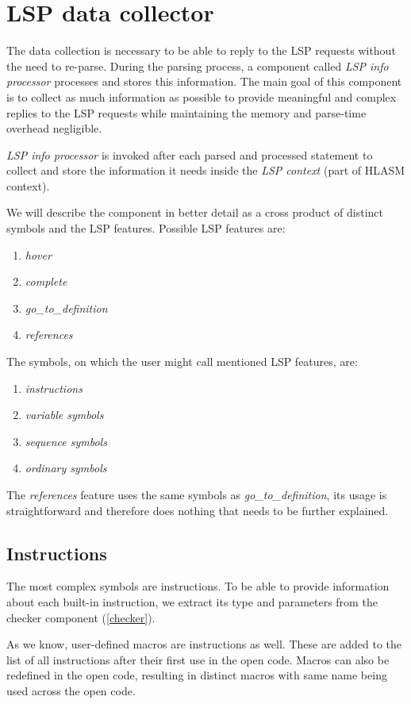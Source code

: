 \section{LSP data collector}
\label{lsp_data}
The data collection is necessary to be able to reply to the LSP requests without the need to re-parse. During the parsing process, a component called \emph{LSP info processor} processes and stores this information. The main goal of this component is to collect as much information as possible to provide meaningful and complex replies to the LSP requests while maintaining the memory and parse-time overhead negligible.

\emph{LSP info processor} is invoked after each parsed and processed statement to collect and store the information it needs inside the \emph{LSP context} (part of HLASM context). 

We will describe the component in better detail as a cross product of distinct symbols and the LSP features. Possible LSP features are:
\begin{enumerate}
	\item \emph{hover}
	\item \emph{complete}
	\item \emph{go\_to\_definition}
	\item \emph{references}
\end{enumerate}
The symbols, on which the user might call mentioned LSP features, are:
\begin{enumerate}
	\item \emph{instructions}
	\item \emph{variable symbols}
	\item \emph{sequence symbols}
	\item \emph{ordinary symbols}
\end{enumerate}

The \emph{references} feature uses the same symbols as \emph{go\_to\_definition}, its usage is straightforward and therefore does nothing that needs to be further explained.

\subsection{Instructions}

The most complex symbols are instructions. To be able to provide information about each built-in instruction, we extract its type and parameters from the checker component (\cref{checker}).

As we know, user-defined macros are instructions as well. These are added to the list of all instructions after their first use in the open code. Macros can also be redefined in the open code, resulting in distinct macros with same name being used across the open code.

